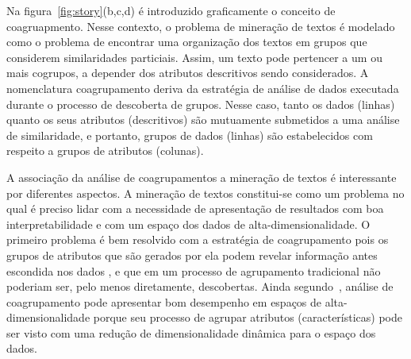 \documentclass[
    12pt,                %
    oneside,            %
    a4paper,            %
    english,            %
    brazil                %
    ]{abntex2ppgsi}
\begin{document}

Na figura~\ref{fig:story}(b,c,d) é introduzido graficamente o conceito de coagruapmento. Nesse contexto, o problema de mineração de textos é modelado como o problema de encontrar uma organização dos textos em grupos que considerem similaridades particiais. Assim, um texto pode pertencer a um ou mais cogrupos, a depender dos atributos descritivos sendo considerados. A nomenclatura coagrupamento deriva da estratégia de análise de dados executada durante o processo de descoberta de grupos. Nesse caso, tanto os dados (linhas) quanto os seus atributos (descritivos) são mutuamente submetidos a uma análise de similaridade, e portanto, grupos de dados (linhas) são estabelecidos com respeito a grupos de atributos (colunas).



A associação da análise de coagrupamentos a mineração de textos é interessante por diferentes aspectos. A mineração de textos constitui-se como um problema no qual é preciso lidar com a necessidade de apresentação de resultados com boa interpretabilidade e com um espaço dos dados de alta-dimensionalidade. O primeiro problema é bem resolvido com a estratégia de coagrupamento pois os grupos de atributos que são gerados por ela podem revelar informação antes escondida nos dados \cite{Tjhi2009}, e que em um processo de agrupamento tradicional não poderiam ser, pelo menos diretamente, descobertas. Ainda segundo~\cite{Tjhi2009}, análise de coagrupamento pode apresentar bom desempenho em espaços de alta-dimensionalidade porque seu processo de agrupar atributos (características) pode ser visto com uma redução de dimensionalidade dinâmica para o espaço dos dados.
\end{document}
